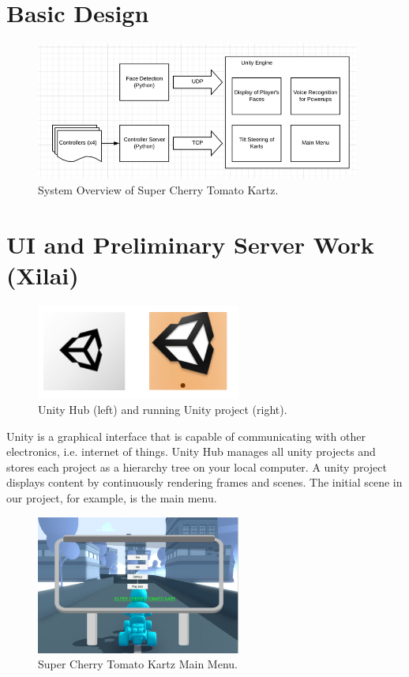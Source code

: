 \documentclass[a4paper,10pt]{article}
\begin{document}
\section{Basic Design}
\begin{figure}[H]
  \centering
      \includegraphics[width=0.95\textwidth]{Assets/System.png}
  \caption{System Overview of Super Cherry Tomato Kartz.}
\end{figure}


\section{UI and Preliminary Server Work (Xilai)}

\begin{figure}[H]
  \centering
      \includegraphics[width=0.6\textwidth]{Assets/Unity.png}
  \caption{Unity Hub (left) and running Unity project (right).}
\end{figure}

Unity is a graphical interface that is capable of communicating with other electronics, i.e. internet of things. Unity Hub manages all unity projects and stores each project as a hierarchy tree on your local computer. A unity project displays content by continuously rendering frames and scenes. The initial scene in our project, for example, is the main menu.

 \begin{figure}[H]
  \centering
      \includegraphics[width=0.6\textwidth]{Assets/MainMenu.png}
  \caption{Super Cherry Tomato Kartz Main Menu.}
\end{figure}
\end{document}
